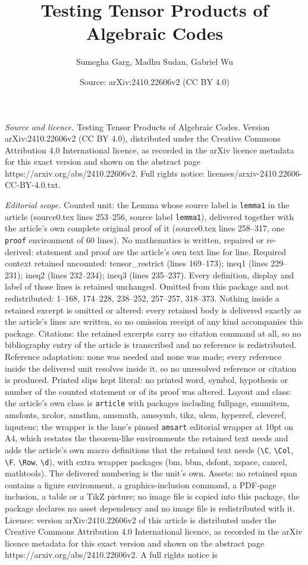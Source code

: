 \documentclass[10pt,a4paper]{amsart}
\title[Testing Tensor Products of Algebraic Codes]{Testing Tensor Products of Algebraic Codes}
\author{Sumegha Garg, Madhu Sudan, Gabriel Wu}
\date{Source: arXiv:2410.22606v2 (CC BY 4.0)}
\begin{document}
\maketitle

\noindent\emph{Source and licence.} Testing Tensor Products of Algebraic Codes. Version arXiv:2410.22606v2 (CC BY 4.0), distributed under the Creative Commons Attribution 4.0 International licence, as recorded in the arXiv licence metadata for this exact version and shown on the abstract page https://arxiv.org/abs/2410.22606v2. Full rights notice: licenses/arxiv-2410.22606-CC-BY-4.0.txt.\par\smallskip

\noindent\textit{Editorial scope.} Counted unit: the Lemma whose source label is \texttt{lemma1} in the article (source0.tex lines 253--256, source label \texttt{lemma1}), delivered together with the article's own complete original proof of it (source0.tex lines 258--317, one \texttt{proof} environment of 60 lines). No mathematics is written, repaired or re-derived: statement and proof are the article's own text line for line. Required context retained uncounted: tensor\_restrict (lines 169--173); ineq1 (lines 229--231); ineq2 (lines 232--234); ineq3 (lines 235--237). Every definition, display and label of those lines is retained unchanged. Omitted from this package and not redistributed: 1--168, 174--228, 238--252, 257--257, 318--373. Nothing inside a retained excerpt is omitted or altered: every retained body is delivered exactly as the article's lines are written, so no omission receipt of any kind accompanies this package. Citations: the retained excerpts carry no citation command at all, so no bibliography entry of the article is transcribed and no reference is redistributed. Reference adaptation: none was needed and none was made; every reference inside the delivered unit resolves inside it, so no unresolved reference or citation is produced. Printed slips kept literal: no printed word, symbol, hypothesis or number of the counted statement or of its proof was altered. Layout and class: the article's own class is \texttt{article} with packages including fullpage, enumitem, amsfonts, xcolor, amsthm, amsmath, amssymb, tikz, ulem, hyperref, cleveref, inputenc; the wrapper is the lane's pinned \texttt{amsart} editorial wrapper at 10pt on A4, which restates the theorem-like environments the retained text needs and adds the article's own macro definitions that the retained text needs (\texttt{\textbackslash C}, \texttt{\textbackslash Col}, \texttt{\textbackslash F}, \texttt{\textbackslash Row}, \texttt{\textbackslash d}), with extra wrapper packages (bm, bbm, dsfont, xspace, cancel, mathtools). The delivered numbering is the unit's own. Assets: no retained span contains a figure environment, a graphics-inclusion command, a PDF-page inclusion, a table or a TikZ picture; no image file is copied into this package, the package declares no asset dependency and no image file is redistributed with it. Licence: version arXiv:2410.22606v2 of this article is distributed under the Creative Commons Attribution 4.0 International licence, as recorded in the arXiv licence metadata for this exact version and shown on the abstract page https://arxiv.org/abs/2410.22606v2. A full rights notice is 
\end{document}
